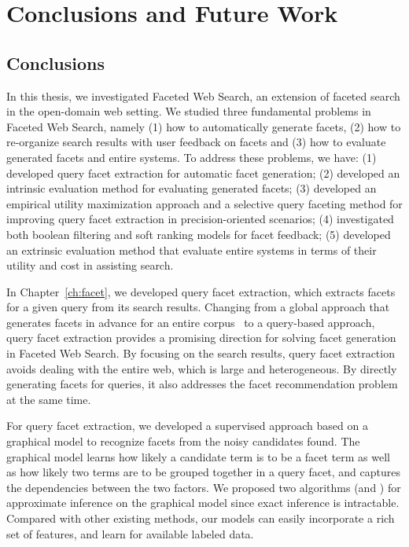 \chapter{Conclusions and Future Work}
\label{ch:conclusions}
\section{Conclusions}
In this thesis, we investigated Faceted Web Search, an extension of faceted search in the open-domain web setting. We studied three fundamental problems in Faceted Web Search, namely (1) how to automatically generate facets, (2) how to re-organize search results with user feedback on facets and (3) how to evaluate generated facets and entire systems. To address these problems, we have: (1) developed query facet extraction for automatic facet generation; (2) developed an intrinsic evaluation method for evaluating generated facets; (3) developed an empirical utility maximization approach and a selective query faceting method for improving query facet extraction in precision-oriented scenarios; (4) investigated both boolean filtering and soft ranking models for facet feedback; (5) developed an extrinsic evaluation method that evaluate entire systems in terms of their utility and cost in assisting search.

In Chapter~\ref{ch:facet}, we developed query facet extraction, which extracts facets for a given query from its search results. Changing from a global approach that generates facets in advance for an entire corpus~\cite{stoica2007automating,dakka2008automatic} to a query-based approach, query facet extraction provides a promising direction for solving facet generation in Faceted Web Search.
By focusing on the search results, query facet extraction avoids dealing with the entire web, which is large and heterogeneous. By directly generating facets for queries, it also addresses the facet recommendation problem at the same time.
 
For query facet extraction, we developed a supervised approach based on a graphical model to recognize facets from the noisy candidates found. The graphical model learns how likely a candidate term is to be a facet term as well as how likely two terms are to be grouped together in a query facet, and captures the dependencies between the two factors. We proposed two algorithms (\QFI and \QFJ) for approximate inference on the graphical model since exact inference is intractable. Compared with other existing methods, our models can easily incorporate a rich set of features, and learn for available labeled data.

